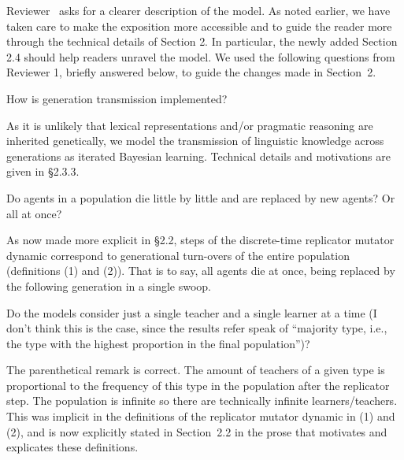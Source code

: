 \documentclass[12pt,a4paper]{article}
\begin{document}
\noindent Reviewer \thereviewerCounter~asks for a clearer description of the model. As noted earlier, we have taken care to make the exposition more accessible and to guide the reader more through the technical details of Section 2. In particular, the newly added Section 2.4 should help readers unravel the model. We used the following questions from Reviewer 1, briefly answered below, to guide the changes made in Section~2.

\vspace{.5cm}
\begin{mdframed}[backgroundcolor=gray!25,linecolor=gray!25]
How is generation transmission implemented?
\end{mdframed}
As it is unlikely that lexical representations and/or pragmatic reasoning are inherited genetically, we model the transmission of linguistic knowledge across generations as  iterated Bayesian learning. Technical details and motivations are given in \S 2.3.3.

\vspace{.5cm}
\begin{mdframed}[backgroundcolor=gray!25,linecolor=gray!25]
Do agents in a population die little by little and are replaced by new agents? Or all at once?
\end{mdframed}
As now made more explicit in \S2.2, steps of the discrete-time replicator mutator dynamic correspond to generational turn-overs of the entire population (definitions (1) and (2)). That is to say, all agents die at once, being replaced by the following generation in a single swoop. 

\vspace{.5cm}
\begin{mdframed}[backgroundcolor=gray!25,linecolor=gray!25]
Do the models consider just a single teacher and a single learner at a time (I don't think this is the case, since the results refer speak of ``majority type, i.e., the type with the highest proportion in the final population'')?
\end{mdframed}
The parenthetical remark is correct. The amount of teachers of a given type is proportional to the frequency of this type in the population after the replicator step. The population is infinite so there are technically infinite learners/teachers. This was implicit in the definitions of the replicator mutator dynamic in (1) and (2), and is now explicitly stated in Section~2.2 in the prose that motivates and explicates these definitions.
\end{document}
